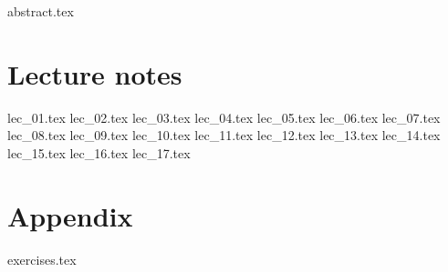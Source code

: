 \documentclass[fancyfoot, git]{mkessler-script}
\author{Simon (Morpheus) Cyrani}
\begin{document}
\maketitle

{abstract.tex}

\cleardoublepage
\tableofcontents

\cleardoublepage
\summaryoflectures

\cleardoublepage
\part{Lecture notes}
{lec_01.tex}
{lec_02.tex}
{lec_03.tex}
{lec_04.tex}
{lec_05.tex}
{lec_06.tex}
{lec_07.tex}
{lec_08.tex}
{lec_09.tex}
{lec_10.tex}
{lec_11.tex}
{lec_12.tex}
{lec_13.tex}
{lec_14.tex}
{lec_15.tex}
{lec_16.tex}
{lec_17.tex}


\cleardoublepage
\appendix
\part{Appendix}

{exercises.tex}

\cleardoublepage

\cleardoublepage
\printvocabindex

\cleardoublepage
\printimageattributions

\cleardoublepage
\printliterature
\end{document}
